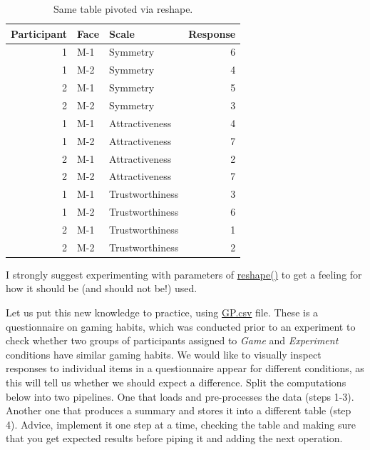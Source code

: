 \documentclass[
]{book}
\begin{document}
\begin{table}

\caption{\label{tab:unnamed-chunk-205}Same table pivoted via reshape.}
\centering
\begin{tabular}[t]{r|l|l|r}
\hline
Participant & Face & Scale & Response\\
\hline
1 & M-1 & Symmetry & 6\\
\hline
1 & M-2 & Symmetry & 4\\
\hline
2 & M-1 & Symmetry & 5\\
\hline
2 & M-2 & Symmetry & 3\\
\hline
1 & M-1 & Attractiveness & 4\\
\hline
1 & M-2 & Attractiveness & 7\\
\hline
2 & M-1 & Attractiveness & 2\\
\hline
2 & M-2 & Attractiveness & 7\\
\hline
1 & M-1 & Trustworthiness & 3\\
\hline
1 & M-2 & Trustworthiness & 6\\
\hline
2 & M-1 & Trustworthiness & 1\\
\hline
2 & M-2 & Trustworthiness & 2\\
\hline
\end{tabular}
\end{table}

I strongly suggest experimenting with parameters of \href{https://stat.ethz.ch/R-manual/R-patched/library/stats/html/reshape.html}{reshape()} to get a feeling for how it should be (and should not be!) used.

Let us put this new knowledge to practice, using \href{data/GP.csv}{GP.csv} file. These is a questionnaire on gaming habits, which was conducted prior to an experiment to check whether two groups of participants assigned to \emph{Game} and \emph{Experiment} conditions have similar gaming habits. We would like to visually inspect responses to individual items in a questionnaire appear for different conditions, as this will tell us whether we should expect a difference. Split the computations below into two pipelines. One that loads and pre-processes the data (steps 1-3). Another one that produces a summary and stores it into a different table (step 4). Advice, implement it one step at a time, checking the table and making sure that you get expected results before piping it and adding the next operation.
\end{document}
